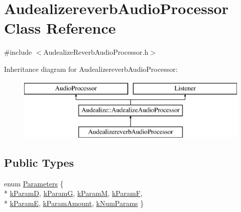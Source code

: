 \hypertarget{class_audealizereverb_audio_processor}{}\section{Audealizereverb\+Audio\+Processor Class Reference}
\label{class_audealizereverb_audio_processor}


{\ttfamily \#include $<$Audealize\+Reverb\+Audio\+Processor.\+h$>$}

Inheritance diagram for Audealizereverb\+Audio\+Processor\+:\begin{figure}[H]
\begin{center}
\leavevmode
\includegraphics[height=3.000000cm]{class_audealizereverb_audio_processor}
\end{center}
\end{figure}
\subsection*{Public Types}
\begin{DoxyCompactItemize}
\item 
enum \hyperlink{class_audealizereverb_audio_processor_a3b91929bb24b4343f125868b07d2673d}{Parameters} \{ \\*
\hyperlink{class_audealizereverb_audio_processor_a3b91929bb24b4343f125868b07d2673da2954ee7bb9b072eb1877fb02a8c914f4}{k\+ParamD}, 
\hyperlink{class_audealizereverb_audio_processor_a3b91929bb24b4343f125868b07d2673dac1b6cac71494fc477a0a19550dcce278}{k\+ParamG}, 
\hyperlink{class_audealizereverb_audio_processor_a3b91929bb24b4343f125868b07d2673dafb8a1c3432750e74438a8957bcda0143}{k\+ParamM}, 
\hyperlink{class_audealizereverb_audio_processor_a3b91929bb24b4343f125868b07d2673dae9ed2e75c4a3ed5288ace8b7e83cce97}{k\+ParamF}, 
\\*
\hyperlink{class_audealizereverb_audio_processor_a3b91929bb24b4343f125868b07d2673dac439a35ede98d09c1af63d3ca8cb2e17}{k\+ParamE}, 
\hyperlink{class_audealizereverb_audio_processor_a3b91929bb24b4343f125868b07d2673da449473553568787f3d6cee0e4e3a7e59}{k\+Param\+Amount}, 
\hyperlink{class_audealizereverb_audio_processor_a3b91929bb24b4343f125868b07d2673da0b9313be142a40acb04f7d90bd06e7e8}{k\+Num\+Params}
 \}
\end{DoxyCompactItemize}
